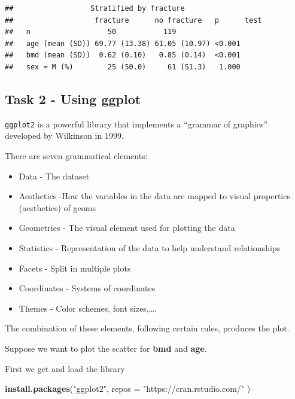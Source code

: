 \documentclass[
]{book}
\newenvironment{Shaded}{\begin{snugshade}}{\end{snugshade}}
\newcommand{\AttributeTok}[1]{\textcolor[rgb]{0.13,0.29,0.53}{#1}}
\newcommand{\FunctionTok}[1]{\textcolor[rgb]{0.13,0.29,0.53}{\textbf{#1}}}
\newcommand{\NormalTok}[1]{#1}
\newcommand{\StringTok}[1]{\textcolor[rgb]{0.31,0.60,0.02}{#1}}
\providecommand{\tightlist}{%
  \setlength{\itemsep}{0pt}\setlength{\parskip}{0pt}}
\begin{document}
\begin{verbatim}
##                  Stratified by fracture
##                   fracture      no fracture   p      test
##   n                  50           119                    
##   age (mean (SD)) 69.77 (13.38) 61.05 (10.97) <0.001     
##   bmd (mean (SD))  0.62 (0.10)   0.85 (0.14)  <0.001     
##   sex = M (%)        25 (50.0)     61 (51.3)   1.000
\end{verbatim}

\subsection{Task 2 - Using ggplot}\label{task-2---using-ggplot}

\texttt{ggplot2} is a powerful library that implements a ``grammar of graphics''
developed by Wilkinson in 1999.

There are seven grammatical elements:

\begin{itemize}
\tightlist
\item
  Data - The dataset
\item
  Aesthetics -How the variables in the data are mapped to visual properties
  (aesthetics) of geoms
\item
  Geometries - The visual element used for plotting the data
\item
  Statistics - Representation of the data to help understand relationships
\item
  Facets - Split in multiple plots
\item
  Coordinates - Systems of coordinates
\item
  Themes - Color schemes, font sizes,\ldots.
\end{itemize}

The combination of these elements, following certain rules, produces the plot.

Suppose we want to plot the scatter for \textbf{bmd} and \textbf{age}.

First we get and load the library

\begin{Shaded}
\begin{Highlighting}[]
\FunctionTok{install.packages}\NormalTok{(}\StringTok{"ggplot2"}\NormalTok{,}
                 \AttributeTok{repos =} \StringTok{"https://cran.rstudio.com/"}\NormalTok{ )}
\end{Highlighting}
\end{Shaded}
\end{document}
